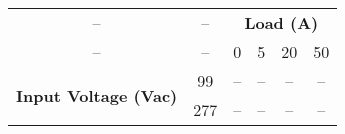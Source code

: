 \begin{tabular}{cccccc}
-- & -- & \multicolumn{4}{c}{\textbf{Load (A)}} \\
-- & -- & 0 & 5 & 20 & 50 \\
\midrule
\multirow{2}{*}{\textbf{Input Voltage (Vac)}} & 99 & -- & -- & -- & -- \\
 & 277 & -- & -- & -- & -- \\
\end{tabular}